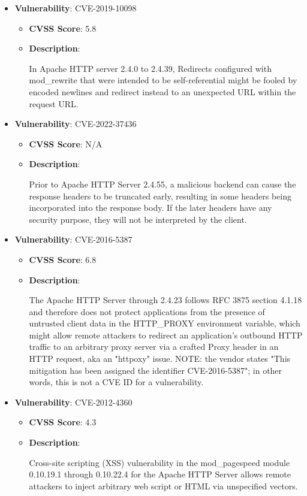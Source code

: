 \documentclass{article}
\begin{document}
\begin{itemize}
        \item \textbf{Vulnerability}: CVE-2019-10098
        \begin{itemize}
            \item \textbf{CVSS Score}:  5.8 
            \item \textbf{Description}:
            \parbox[t]{0.9\linewidth}{
                \ttfamily In Apache HTTP server 2.4.0 to 2.4.39, Redirects configured with mod\_rewrite that were intended to be self-referential might be fooled by encoded newlines and redirect instead to an unexpected URL within the request URL.
            }
        \end{itemize}
    
        \item \textbf{Vulnerability}: CVE-2022-37436
        \begin{itemize}
            \item \textbf{CVSS Score}:  N/A 
            \item \textbf{Description}:
            \parbox[t]{0.9\linewidth}{
                \ttfamily Prior to Apache HTTP Server 2.4.55, a malicious backend can cause the response headers to be truncated early, resulting in some headers being incorporated into the response body. If the later headers have any security purpose, they will not be interpreted by the client.
            }
        \end{itemize}
    
        \item \textbf{Vulnerability}: CVE-2016-5387
        \begin{itemize}
            \item \textbf{CVSS Score}:  6.8 
            \item \textbf{Description}:
            \parbox[t]{0.9\linewidth}{
                \ttfamily The Apache HTTP Server through 2.4.23 follows RFC 3875 section 4.1.18 and therefore does not protect applications from the presence of untrusted client data in the HTTP\_PROXY environment variable, which might allow remote attackers to redirect an application's outbound HTTP traffic to an arbitrary proxy server via a crafted Proxy header in an HTTP request, aka an "httpoxy" issue.  NOTE: the vendor states "This mitigation has been assigned the identifier CVE-2016-5387"; in other words, this is not a CVE ID for a vulnerability.
            }
        \end{itemize}
    
        \item \textbf{Vulnerability}: CVE-2012-4360
        \begin{itemize}
            \item \textbf{CVSS Score}:  4.3 
            \item \textbf{Description}:
            \parbox[t]{0.9\linewidth}{
                \ttfamily Cross-site scripting (XSS) vulnerability in the mod\_pagespeed module 0.10.19.1 through 0.10.22.4 for the Apache HTTP Server allows remote attackers to inject arbitrary web script or HTML via unspecified vectors.
            }
        \end{itemize}
    

\end{itemize}
\end{document}
